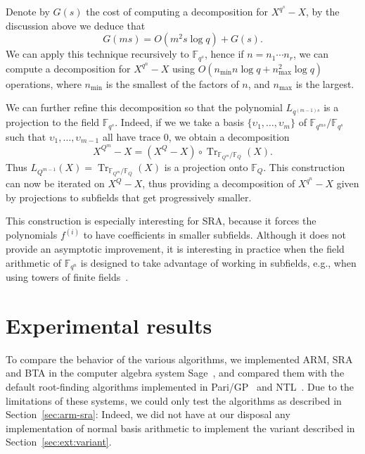 \documentclass{sig-alternate}
\newcommand{\ff}[1]{\mathbb{F}_{#1}}
\newcommand{\qq}{q}
\newcommand{\QQ}{Q}
\newcommand{\nn}{n}
\newcommand{\qn}{{\qq^\nn}}
\newcommand{\extf}{\ff{\qn}}
\DeclareMathOperator{\Tr}{Tr}
\newcounter{algo}
\renewcommand{\paragraph}[1]{\smallskip\noindent{{\bf \rm #1.}}}
\begin{document}
Denote by $G(s)$ the cost of computing a decomposition for
$X^{\qq^s}-X$, by the discussion above we deduce that
\begin{equation*}
  G(ms) = O(m^2s\log\qq) + G(s).
\end{equation*}
We can apply this technique recursively to $\ff{\qq^s}$, hence if
$\nn=\nn_1\cdots \nn_r$, we can compute a decomposition for
$X^{\qq^\nn}-X$ using $O(\nn_{\min}\nn\log\qq + \nn_{\max}^2\log\qq)$
operations, where $\nn_{\min}$ is the smallest of the factors of
$\nn$, and $\nn_{\max}$ is the largest.

\paragraph{Projecting to smaller fields} We can further refine this
decomposition so that the polynomial $L_{\qq^{(m-1)s}}$ is a
projection to the field $\ff{\qq^s}$. Indeed, if we we take a basis
$\{\upsilon_1,\dots,\upsilon_m\}$ of $\ff{\qq^{ms}}/\ff{\qq^s}$ such
that $\upsilon_1,\dots,\upsilon_{m-1}$ all have trace $0$, we obtain a
decomposition
\begin{equation*}
  X^{\QQ^m} - X = (X^\QQ-X)\circ\Tr_{\ff{\QQ^m}/\ff{\QQ}}(X).
\end{equation*}
Thus $L_{\QQ^{m-1}}(X)=\Tr_{\ff{\QQ^m}/\ff{\QQ}}(X)$ is a projection
onto $\ff{\QQ}$. This construction can now be iterated on $X^\QQ-X$,
thus providing a decomposition of $X^{\qn}-X$ given by projections to
subfields that get progressively smaller.

This construction is especially interesting for SRA, because it forces
the polynomials $f^{(i)}$ to have coefficients in smaller
subfields. Although it does not provide an asymptotic improvement, it
is interesting in practice when the field arithmetic of $\extf$ is
designed to take advantage of working in subfields, e.g., when using
towers of finite fields~\cite{df+schost12,DeDoSc13}.



\section{Experimental results}

To compare the behavior of the various algorithms, we implemented ARM,
SRA and BTA in the computer algebra system Sage~\cite{Sage}, and
compared them with the default root-finding algorithms implemented in
Pari/GP~\cite{Pari} and NTL~\cite{ntl}. Due to the limitations of
these systems, we could only test the algorithms as described in
Section~\ref{sec:arm-sra}: Indeed, we did not have at our disposal any
implementation of normal basis arithmetic to implement the variant
described in Section~\ref{sec:ext:variant}.
\end{document}
